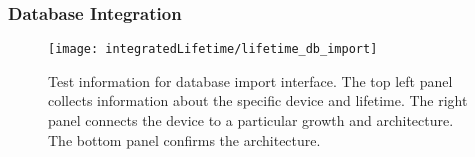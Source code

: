\documentclass[../thesis.tex]{subfiles}
\begin{document}
\subsubsection{Database Integration}
\begin{figure}[h]
    \centering
    \texttt{[image: integratedLifetime/lifetime\_db\_import]}
\caption{Test information for database import interface.  The top left panel collects information about the specific device and lifetime.  The right panel connects the device to a particular growth and architecture.  The bottom panel confirms the architecture.}
\label{fig:lifetime_db_import}
\end{figure}


\end{document}
